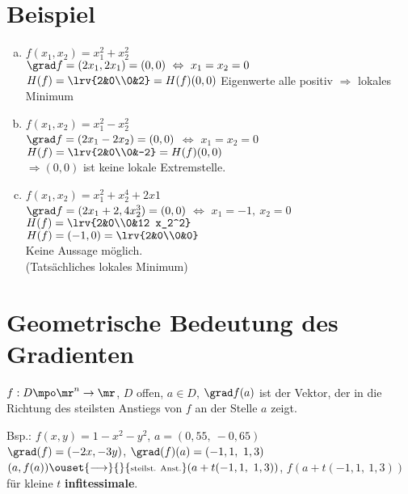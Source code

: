 \section{Beispiel}
	\begin{enumerate}[a)]
		\item $ f(x_1,x_2)=x_1^2+x_2^2 $\\
		$ \grad f=(2x_1,2x_1)=(0,0)\ \Leftrightarrow\ x_1=x_2=0 $\\
		$ H(f)=\lrv{2&0\\0&2}=H(f)(0,0) $ Eigenwerte alle positiv $ \Rightarrow $ lokales Minimum
		\item  $ f(x_1,x_2)=x_1^2-x_2^2 $\\
		$ \grad f=(2x_1-2x_2) =(0,0)$ $ \Leftrightarrow $ $ x_1=x_2=0 $\\
		$ H(f)=\lrv{2&0\\0&-2}=H(f)(0,0) $\\
		$ \Rightarrow (0,0) $ ist keine lokale Extremstelle.
		\item  $ f(x_1,x_2)=x_1^2+x_2^4+2x1 $\\
		$ \grad f=(2x_1+2,4x_2^3)=(0,0) $ $ \Leftrightarrow $ $ x_1=-1,\ x_2=0 $\\
		$ H(f)=\lrv{2&0\\0&12 x_2^2} $\\
		$ H(f)=(-1,0)=\lrv{2&0\\0&0} $\\
		Keine Aussage möglich.\\
		(Tatsächliches lokales Minimum)
	\end{enumerate}

\section{Geometrische Bedeutung des Gradienten}
	$ f:D\mpo\mr^n\rightarrow\mr $, $ D $ offen, $ a\in D $, $ \grad f(a)$ ist der Vektor, der in die Richtung des steilsten Anstiegs von $ f $ an der Stelle $ a $ zeigt.
	
	Bsp.: $ f(x,y)=1-x^2-y^2 $, $ a=(0,55,\ -0,65) $\\
	$ \grad(f)=(-2x,-3y) $, $ \grad(f)(a)=(-1,1,\ 1,3) $\\
	$ (a,f(a))\ouset{\longrightarrow}{}{\mbox{\scriptsize steilst. Anst.}} (a+t(-1,1,\ 1,3)) $, $ f(a+t(-1,1,\ 1,3)) $ für kleine $ t $ \textbf{infitessimale}.

